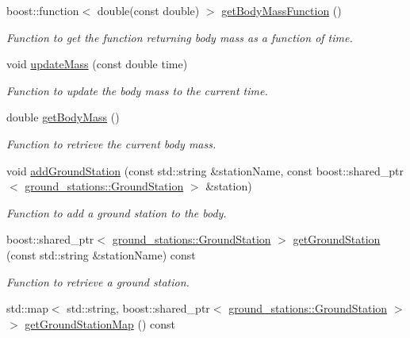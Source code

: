 \begin{DoxyCompactItemize}
boost\+::function$<$ double(const double) $>$ \hyperlink{classtudat_1_1simulation__setup_1_1Body_a74dd82ccc5ffb2bb1dcaad58615bf620}{get\+Body\+Mass\+Function} ()
\begin{DoxyCompactList}\small\item\em Function to get the function returning body mass as a function of time. \end{DoxyCompactList}\item 
void \hyperlink{classtudat_1_1simulation__setup_1_1Body_aee9b25e036b5196abf916ef67f219fab}{update\+Mass} (const double time)
\begin{DoxyCompactList}\small\item\em Function to update the body mass to the current time. \end{DoxyCompactList}\item 
double \hyperlink{classtudat_1_1simulation__setup_1_1Body_a94f591d02b553b3450ad78172e50350d}{get\+Body\+Mass} ()
\begin{DoxyCompactList}\small\item\em Function to retrieve the current body mass. \end{DoxyCompactList}\item 
void \hyperlink{classtudat_1_1simulation__setup_1_1Body_ab23764a38675d6f9f9fc5c22212ac13f}{add\+Ground\+Station} (const std\+::string \&station\+Name, const boost\+::shared\+\_\+ptr$<$ \hyperlink{classtudat_1_1ground__stations_1_1GroundStation}{ground\+\_\+stations\+::\+Ground\+Station} $>$ \&station)
\begin{DoxyCompactList}\small\item\em Function to add a ground station to the body. \end{DoxyCompactList}\item 
boost\+::shared\+\_\+ptr$<$ \hyperlink{classtudat_1_1ground__stations_1_1GroundStation}{ground\+\_\+stations\+::\+Ground\+Station} $>$ \hyperlink{classtudat_1_1simulation__setup_1_1Body_a9d81354ec4acca0a2905688ee6e57030}{get\+Ground\+Station} (const std\+::string \&station\+Name) const 
\begin{DoxyCompactList}\small\item\em Function to retrieve a ground station. \end{DoxyCompactList}\item 
std\+::map$<$ std\+::string, boost\+::shared\+\_\+ptr$<$ \hyperlink{classtudat_1_1ground__stations_1_1GroundStation}{ground\+\_\+stations\+::\+Ground\+Station} $>$ $>$ \hyperlink{classtudat_1_1simulation__setup_1_1Body_ad0116ec0c6ef74c0ad8bcdf9b22b548e}{get\+Ground\+Station\+Map} () const 

\end{DoxyCompactItemize}
